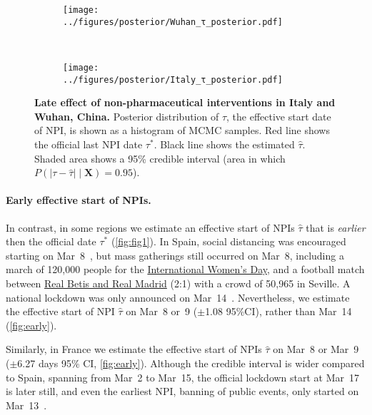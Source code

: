\documentclass[12pt]{extarticle}
\let\vec\mathbf
\begin{document}
\begin{figure}[h]
    \centering
    \begin{subfigure}{0.45\textwidth}
        \texttt{[image: ../figures/posterior/Wuhan\_τ\_posterior.pdf]}
    \end{subfigure}
  	~
    \begin{subfigure}{0.45\textwidth}
        \texttt{[image: ../figures/posterior/Italy\_τ\_posterior.pdf]}
    \end{subfigure}
    \caption{
	\textbf{Late effect of non-pharmaceutical interventions in Italy and Wuhan, China.}
    Posterior distribution of $\tau$, the effective start date of NPI, is shown as a histogram of MCMC samples. Red line shows the official last NPI date $\tau^*$. Black line shows the estimated $\hat{\tau}$. Shaded area shows a 95\% credible interval (area in which $P(|\tau - \hat{\tau}| \mid \vec{X}) = 0.95$). 
    }
    \label{fig:late}
\end{figure}



\paragraph*{Early effective start of NPIs.}
In contrast, in some regions we estimate an effective start of NPIs $\hat{\tau}$ that is \emph{earlier} then the official date $\tau^*$ (\autoref{fig:fig1}).
In Spain, social distancing was encouraged starting on Mar~8~\citep{Flaxman2020}, but mass gatherings still occurred on Mar~8, including a march of 120,000 people for the \href{https://www.nytimes.com/2020/03/13/world/europe/spain-coronavirus-emergency.html}{International Women's Day}, and a  football match between \href{https://www.espn.com/soccer/match?gameId=550350}{Real Betis and Real Madrid} (2:1) with a crowd of 50,965 in Seville.
A national lockdown was only announced on Mar~14~\citep{Flaxman2020}.
Nevertheless, we estimate the effective start of NPI $\hat{\tau}$ on Mar~8 or~9 ($\pm$1.08 95\%CI), rather than Mar~14 (\autoref{fig:early}).

Similarly, in France we estimate the effective start of NPIs $\hat{\tau}$ on Mar~8 or Mar~9 ($\pm$6.27 days 95\% CI, \autoref{fig:early}). Although the credible interval is wider compared to Spain, spanning from Mar~2 to Mar~15, the official lockdown start at Mar~17 is later still, and even the earliest NPI, banning of public events, only started on Mar~13~\citep{Flaxman2020}.
\end{document}
